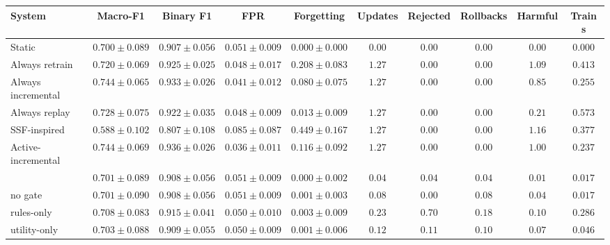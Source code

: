 \begin{tabular}{lccccccccc}
\toprule
System & Macro-F1 & Binary F1 & FPR & Forgetting & Updates & Rejected & Rollbacks & Harmful & Train s \\
\midrule
Static             & $0.700\pm0.089$ & $0.907\pm0.056$ & $0.051\pm0.009$ & $0.000\pm0.000$ & $0.00$ & $0.00$ & $0.00$ & $0.00$ & $0.000$ \\
Always retrain     & $0.720\pm0.069$ & $0.925\pm0.025$ & $0.048\pm0.017$ & $0.208\pm0.083$ & $1.27$ & $0.00$ & $0.00$ & $1.09$ & $0.413$ \\
Always incremental & $0.744\pm0.065$ & $0.933\pm0.026$ & $0.041\pm0.012$ & $0.080\pm0.075$ & $1.27$ & $0.00$ & $0.00$ & $0.85$ & $0.255$ \\
Always replay      & $0.728\pm0.075$ & $0.922\pm0.035$ & $0.048\pm0.009$ & $0.013\pm0.009$ & $1.27$ & $0.00$ & $0.00$ & $0.21$ & $0.573$ \\
SSF-inspired       & $0.588\pm0.102$ & $0.807\pm0.108$ & $0.085\pm0.087$ & $0.449\pm0.167$ & $1.27$ & $0.00$ & $0.00$ & $1.16$ & $0.377$ \\
Active-incremental & $0.744\pm0.069$ & $0.936\pm0.026$ & $0.036\pm0.011$ & $0.116\pm0.092$ & $1.27$ & $0.00$ & $0.00$ & $1.00$ & $0.237$ \\
\midrule
\evox{}            & $0.701\pm0.089$ & $0.908\pm0.056$ & $0.051\pm0.009$ & $0.000\pm0.002$ & $0.04$ & $0.04$ & $0.04$ & $0.01$ & $0.017$ \\
\evox{} no gate    & $0.701\pm0.090$ & $0.908\pm0.056$ & $0.051\pm0.009$ & $0.001\pm0.003$ & $0.08$ & $0.00$ & $0.08$ & $0.04$ & $0.017$ \\
\evox{} rules-only & $0.708\pm0.083$ & $0.915\pm0.041$ & $0.050\pm0.010$ & $0.003\pm0.009$ & $0.23$ & $0.70$ & $0.18$ & $0.10$ & $0.286$ \\
\evox{} utility-only & $0.703\pm0.088$ & $0.909\pm0.055$ & $0.050\pm0.009$ & $0.001\pm0.006$ & $0.12$ & $0.11$ & $0.10$ & $0.07$ & $0.046$ \\
\bottomrule
\end{tabular}
